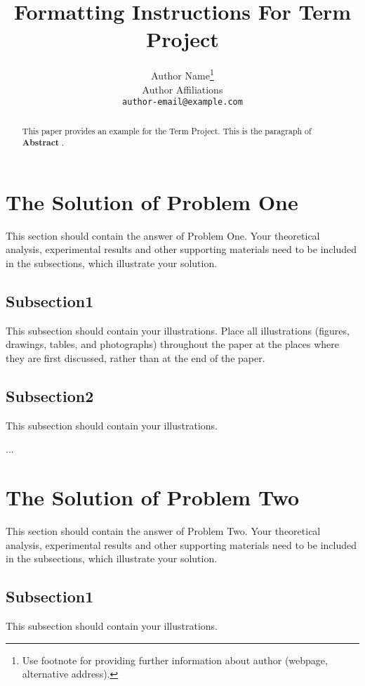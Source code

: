 \documentclass{article}
\title{Formatting Instructions For Term Project}
\author{%
  Author Name\thanks{Use footnote for providing further information
    about author (webpage, alternative address).} \\
  Author Affiliations\\
  \texttt{author-email@example.com} \\
}
\begin{document}
\maketitle

\begin{abstract}
  This paper provides an example for the Term Project. 
  This is the paragraph of \textbf{Abstract} .
  
  
\end{abstract}

\section{The Solution of Problem One}

This section should contain the answer of Problem One.
Your theoretical analysis, experimental results and other supporting materials 
need to be included in the subsections, which illustrate your solution.

\subsection{Subsection1}

This subsection should contain your illustrations.
Place all illustrations (figures, drawings, tables, and photographs)
throughout the paper at the places where they are first discussed,
rather than at the end of the paper.

\subsection{Subsection2}

This subsection should contain your illustrations.

...

\section{The Solution of Problem Two}


This section should contain the answer of Problem Two.
Your theoretical analysis, experimental results and other supporting materials 
need to be included in the subsections, which illustrate your solution.

\subsection{Subsection1}

This subsection should contain your illustrations.
\end{document}
